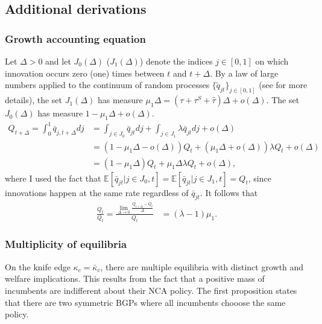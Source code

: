 \documentclass[11pt,english]{article}
\theoremstyle{definition}
\begin{document}
\subsection{Additional derivations}

\subsubsection{Growth accounting equation}\label{appendix:model:growth_accounting_equation}

Let $\Delta > 0$ and let $J_0(\Delta)$ ($J_1(\Delta)$) denote the indices $j\in [0,1]$ on which innovation occurs zero (one) times between $t$ and $t+\Delta$. By a law of large numbers applied to the continuum of random processes $\{\tilde{q}_{jt}\}_{j \in [0,1]}$ (see \cite{uhlig_law_1996} for more details), the set $J_1(\Delta)$ has measure $\mu_1 \Delta = (\tau + \tau^S + \hat{\tau})\Delta + o(\Delta)$. The set $J_0(\Delta)$ has measure $1 - \mu_1 \Delta + o(\Delta)$. 
\begin{align*}
	Q_{t+\Delta} = \int_0^1 \bar{q}_{j,t+\Delta} dj &= \int_{j \in J_0} \bar{q}_{jt} dj + \int_{j \in J_1} \lambda \bar{q}_{jt} dj + o(\Delta) \\
	&= (1 - \mu_1\Delta - o(\Delta)) Q_t + (\mu_1 \Delta + o(\Delta) ) \lambda Q_t + o(\Delta) \\
	&= (1 - \mu_1\Delta) Q_t + \mu_1\Delta \lambda Q_t + o(\Delta),
\end{align*}
where I used the fact that $\mathbb{E}[\bar{q}_{jt} | j \in J_0, t]  = \mathbb{E}[\bar{q}_{jt} | j \in J_1, t] = Q_t$, since innovations happen at the same rate regardless of $\bar{q}_{jt}$. It follows that
\begin{align*}
	\frac{\dot{Q}_t}{Q_t} = \frac{\lim_{\Delta \to 0} \frac{Q_{t+\Delta} - Q_t}{\Delta}}{Q_t} &= (\lambda - 1)\mu_1.
\end{align*}

\subsubsection{Multiplicity of equilibria}\label{appendix:model:multiplicity_of_equilibria}

On the knife edge $\kappa_c = \bar{\kappa}_c$, there are multiple equilibria with distinct growth and welfare implications. This results from the fact that a positive mass of incumbents are indifferent about their NCA policy. The first proposition states that there are two symmetric BGPs where all incumbents chooose the same policy.
\end{document}

